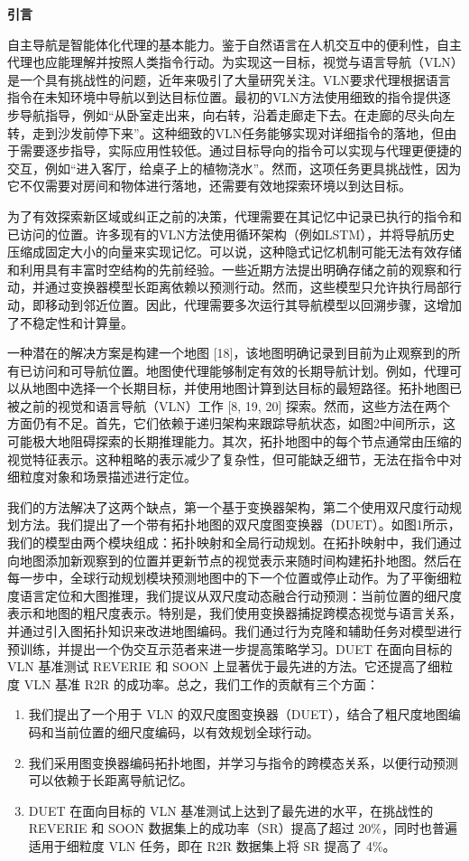\documentclass[bachelor]{thesis-uestc}
\begin{document}
\textbf{引言}

自主导航是智能体化代理的基本能力。鉴于自然语言在人机交互中的便利性，自主代理也应能理解并按照人类指令行动。为实现这一目标，视觉与语言导航（VLN）是一个具有挑战性的问题，近年来吸引了大量研究关注。VLN要求代理根据语言指令在未知环境中导航以到达目标位置。最初的VLN方法使用细致的指令提供逐步导航指导，例如“从卧室走出来，向右转，沿着走廊走下去。在走廊的尽头向左转，走到沙发前停下来”。这种细致的VLN任务能够实现对详细指令的落地，但由于需要逐步指导，实际应用性较低。通过目标导向的指令可以实现与代理更便捷的交互，例如“进入客厅，给桌子上的植物浇水”。然而，这项任务更具挑战性，因为它不仅需要对房间和物体进行落地，还需要有效地探索环境以到达目标。

为了有效探索新区域或纠正之前的决策，代理需要在其记忆中记录已执行的指令和已访问的位置。许多现有的VLN方法使用循环架构（例如LSTM），并将导航历史压缩成固定大小的向量来实现记忆。可以说，这种隐式记忆机制可能无法有效存储和利用具有丰富时空结构的先前经验。一些近期方法提出明确存储之前的观察和行动，并通过变换器模型长距离依赖以预测行动。然而，这些模型只允许执行局部行动，即移动到邻近位置。因此，代理需要多次运行其导航模型以回溯步骤，这增加了不稳定性和计算量。

一种潜在的解决方案是构建一个地图 [18]，该地图明确记录到目前为止观察到的所有已访问和可导航位置。地图使代理能够制定有效的长期导航计划。例如，代理可以从地图中选择一个长期目标，并使用地图计算到达目标的最短路径。拓扑地图已被之前的视觉和语言导航（VLN）工作 [8, 19, 20] 探索。然而，这些方法在两个方面仍有不足。首先，它们依赖于递归架构来跟踪导航状态，如图2中间所示，这可能极大地阻碍探索的长期推理能力。其次，拓扑地图中的每个节点通常由压缩的视觉特征表示。这种粗略的表示减少了复杂性，但可能缺乏细节，无法在指令中对细粒度对象和场景描述进行定位。

我们的方法解决了这两个缺点，第一个基于变换器架构，第二个使用双尺度行动规划方法。我们提出了一个带有拓扑地图的双尺度图变换器（DUET）。如图1所示，我们的模型由两个模块组成：拓扑映射和全局行动规划。在拓扑映射中，我们通过向地图添加新观察到的位置并更新节点的视觉表示来随时间构建拓扑地图。然后在每一步中，全球行动规划模块预测地图中的下一个位置或停止动作。为了平衡细粒度语言定位和大图推理，我们提议从双尺度动态融合行动预测：当前位置的细尺度表示和地图的粗尺度表示。特别是，我们使用变换器捕捉跨模态视觉与语言关系，并通过引入图拓扑知识来改进地图编码。我们通过行为克隆和辅助任务对模型进行预训练，并提出一个伪交互示范者来进一步提高策略学习。DUET 在面向目标的 VLN 基准测试 REVERIE 和 SOON 上显著优于最先进的方法。它还提高了细粒度 VLN 基准 R2R 的成功率。总之，我们工作的贡献有三个方面：
\begin{enumerate}
    \item 我们提出了一个用于 VLN 的双尺度图变换器（DUET），结合了粗尺度地图编码和当前位置的细尺度编码，以有效规划全球行动。
    \item 我们采用图变换器编码拓扑地图，并学习与指令的跨模态关系，以便行动预测可以依赖于长距离导航记忆。
    \item DUET 在面向目标的 VLN 基准测试上达到了最先进的水平，在挑战性的 REVERIE 和 SOON 数据集上的成功率（SR）提高了超过 20\%，同时也普遍适用于细粒度 VLN 任务，即在 R2R 数据集上将 SR 提高了 4\%。
\end{enumerate}
\end{document}
